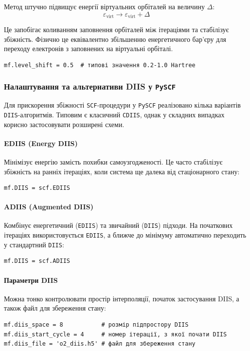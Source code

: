 Метод штучно підвищує енергії віртуальних орбіталей на величину $\Delta$:
\begin{equation}
\varepsilon_{\text{virt}} \to \varepsilon_{\text{virt}} + \Delta
\end{equation}

Це запобігає коливанням заповнення орбіталей між ітераціями та стабілізує збіжність. Фізично це еквівалентно збільшенню енергетичного бар'єру для переходу електронів з заповнених на віртуальні орбіталі.

\begin{verbatim}
mf.level_shift = 0.5  # типові значення 0.2-1.0 Hartree
\end{verbatim}

\subsubsection{Налаштування та альтернативи DIIS у \texttt{PySCF}}

Для прискорення збіжності \texttt{SCF}-процедури у \texttt{PySCF} реалізовано кілька варіантів \texttt{DIIS}-алгоритмів.
Типовим є класичний \texttt{CDIIS}, однак у складних випадках корисно застосовувати розширені схеми.

\paragraph{EDIIS (Energy DIIS)}
Мінімізує енергію замість похибки самоузгодженості. Це часто стабілізує збіжність на ранніх ітераціях, коли система ще далека від стаціонарного стану:
\begin{verbatim}
mf.DIIS = scf.EDIIS
\end{verbatim}

\paragraph{ADIIS (Augmented DIIS)}
Комбінує енергетичний (\texttt{EDIIS}) та звичайний (\texttt{DIIS}) підходи.
На початкових ітераціях використовується \texttt{EDIIS}, а ближче до мінімуму автоматично переходить у стандартний \texttt{DIIS}:
\begin{verbatim}
mf.DIIS = scf.ADIIS
\end{verbatim}

\paragraph{Параметри DIIS}
Можна тонко контролювати простір інтерполяції, початок застосування DIIS, а також файл для збереження стану:
\begin{verbatim}
mf.diis_space = 8           # розмір підпростору DIIS
mf.diis_start_cycle = 4     # номер ітерації, з якої почати DIIS
mf.diis_file = 'o2_diis.h5' # файл для збереження стану
\end{verbatim}

